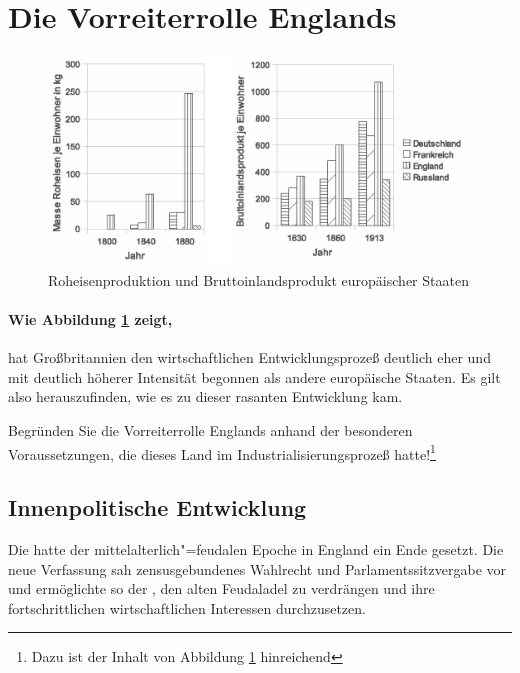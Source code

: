\section{Die Vorreiterrolle Englands}
\label{sec:vorr-gb}

\begin{figure}
\includegraphics[width=\textwidth]{vorr-gb-diag.eps}
\caption{Roheisenproduktion und Bruttoinlandsprodukt europäischer
Staaten}
\label{pic:vorr-gb-diag}
\end{figure}

\paragraph{Wie Abbildung \ref{pic:vorr-gb-diag} zeigt,} hat
Großbritannien den wirtschaftlichen Entwicklungsprozeß deutlich eher
und mit deutlich höherer Intensität begonnen als andere europäische
Staaten. Es gilt also herauszufinden, wie es zu dieser rasanten
Entwicklung kam.\\

\begin{aufgabe}
Begründen Sie die Vorreiterrolle Englands anhand der besonderen
Voraussetzungen, die dieses Land im Industrialisierungsprozeß
hatte!\footnote{Dazu ist der Inhalt von Abbildung
\ref{pic:vorr-gb-diag} hinreichend}
\end{aufgabe} 

\subsection{Innenpolitische Entwicklung}

Die 
 
hatte der mittelalterlich"=feudalen Epoche in England ein Ende gesetzt.
Die neue Verfassung sah zensusgebundenes Wahlrecht und
Parlamentssitzvergabe vor und ermöglichte so der , den
alten Feudaladel zu verdrängen und ihre fortschrittlichen
wirtschaftlichen Interessen durchzusetzen.

